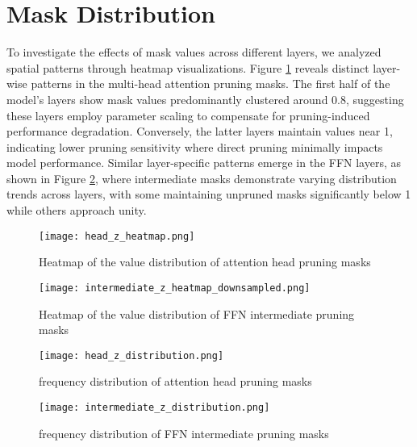 \newpage
\appendix


\section{Mask Distribution}

To investigate the effects of mask values across different layers, we analyzed spatial patterns through heatmap visualizations. Figure \ref{fig:head_z_heatmap} reveals distinct layer-wise patterns in the multi-head attention pruning masks. The first half of the model's layers show mask values predominantly clustered around 0.8, suggesting these layers employ parameter scaling to compensate for pruning-induced performance degradation. Conversely, the latter layers maintain values near 1, indicating lower pruning sensitivity where direct pruning minimally impacts model performance. Similar layer-specific patterns emerge in the FFN layers, as shown in Figure \ref{fig:intermediate_z_heatmap_downsampled}, where intermediate masks demonstrate varying distribution trends across layers, with some maintaining unpruned masks significantly below 1 while others approach unity.


\begin{figure}[ht]
    \centering
    \texttt{[image: head\_z\_heatmap.png]}
    \caption{Heatmap of the value distribution of attention head pruning masks}
    \label{fig:head_z_heatmap}
\end{figure}

\begin{figure}[ht]
    \centering
    \texttt{[image: intermediate\_z\_heatmap\_downsampled.png]}
    \caption{Heatmap of the value distribution of FFN intermediate pruning masks}
    \label{fig:intermediate_z_heatmap_downsampled}
\end{figure}


\begin{figure}[ht]
    \centering
    \texttt{[image: head\_z\_distribution.png]}
    \caption{frequency distribution of attention
head pruning masks}
    \label{fig:head_z_distribution}
\end{figure}

\begin{figure}[ht]
    \centering
    \texttt{[image: intermediate\_z\_distribution.png]}
    \caption{frequency distribution of FFN intermediate pruning masks}
    \label{fig:intermediate_z_distribution}
\end{figure}

